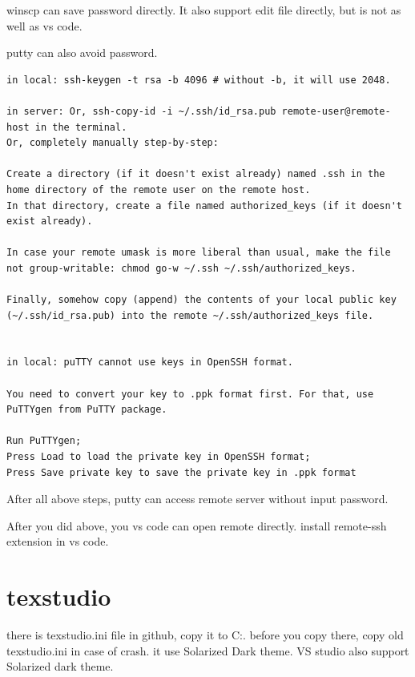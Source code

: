 \documentclass[a4paper,11pt,twoside]{book}
\begin{document}
	winscp can save password directly. It also support edit file directly, but is not as well as vs code. 
	
	putty can also avoid password. 
\begin{verbatim}
in local: ssh-keygen -t rsa -b 4096 # without -b, it will use 2048.

in server: Or, ssh-copy-id -i ~/.ssh/id_rsa.pub remote-user@remote-host in the terminal. 
Or, completely manually step-by-step:

Create a directory (if it doesn't exist already) named .ssh in the home directory of the remote user on the remote host.
In that directory, create a file named authorized_keys (if it doesn't exist already).

In case your remote umask is more liberal than usual, make the file not group-writable: chmod go-w ~/.ssh ~/.ssh/authorized_keys.

Finally, somehow copy (append) the contents of your local public key (~/.ssh/id_rsa.pub) into the remote ~/.ssh/authorized_keys file.


in local: puTTY cannot use keys in OpenSSH format.

You need to convert your key to .ppk format first. For that, use PuTTYgen from PuTTY package.

Run PuTTYgen;
Press Load to load the private key in OpenSSH format;
Press Save private key to save the private key in .ppk format
\end{verbatim}
	After all above steps, putty can access remote server without input password.  

	After you did above, you vs code can open remote directly.  install remote-ssh extension in vs code.
	
	 
\section{texstudio}
there is texstudio.ini file in github, copy it to C:\Users\yzhao\AppData\Roaming\texstudio. before you copy there, copy old texstudio.ini in case of crash. it use Solarized Dark theme. VS studio also support Solarized dark theme. 
\end{document}
